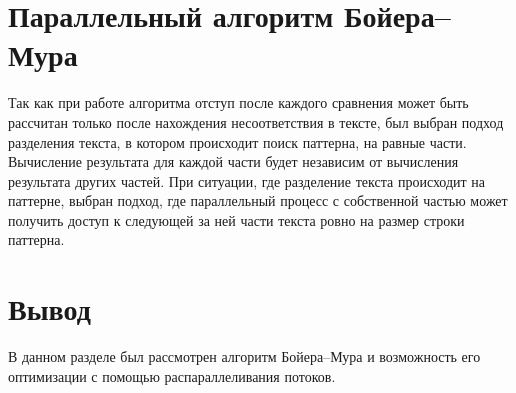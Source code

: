 \section{Параллельный алгоритм Бойера--Мура}
Так как при работе алгоритма отступ после каждого сравнения может быть рассчитан только после нахождения несоответствия в тексте, был выбран подход разделения
текста, в котором происходит поиск паттерна, на равные части. Вычисление результата для каждой части будет независим от вычисления результата других частей. При ситуации, где разделение текста происходит на паттерне,  выбран подход, где параллельный процесс с собственной частью может получить доступ к следующей за ней части текста ровно на размер строки паттерна.

\section*{Вывод}

В данном разделе был рассмотрен алгоритм Бойера--Мура и возможность его оптимизации с помощью распараллеливания потоков.